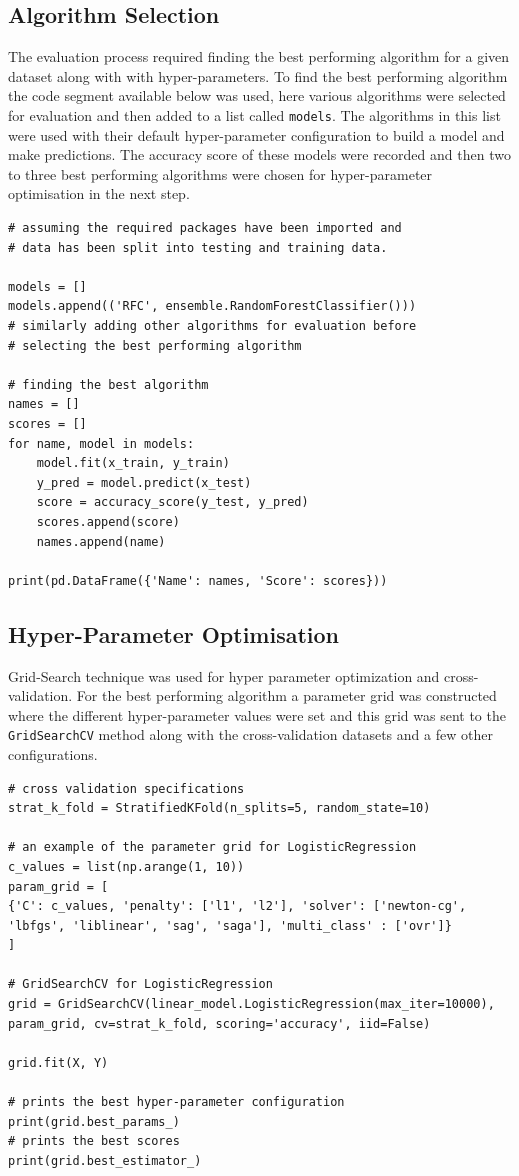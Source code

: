 \subsection*{Algorithm Selection}

The evaluation process required finding the best performing algorithm for a given dataset along with with hyper-parameters. To find the best performing algorithm the code segment available below was used, here various algorithms were selected for evaluation and then added to a list called \texttt{models}. The algorithms in this list were used with their default hyper-parameter configuration to build a model and make predictions. The accuracy score of these models were recorded and then two to three best performing algorithms were chosen for hyper-parameter optimisation in the next step.

\begin{lstlisting}
# assuming the required packages have been imported and 
# data has been split into testing and training data.

models = []
models.append(('RFC', ensemble.RandomForestClassifier()))
# similarly adding other algorithms for evaluation before 
# selecting the best performing algorithm

# finding the best algorithm
names = []
scores = []
for name, model in models:
    model.fit(x_train, y_train)
    y_pred = model.predict(x_test)
    score = accuracy_score(y_test, y_pred)
    scores.append(score)
    names.append(name)

print(pd.DataFrame({'Name': names, 'Score': scores}))
\end{lstlisting}

\subsection*{Hyper-Parameter Optimisation}

Grid-Search technique was used for hyper parameter optimization and cross-validation. For the best performing algorithm a parameter grid was constructed where the different hyper-parameter values were set and this grid was sent to the \texttt{GridSearchCV} method along with the cross-validation datasets and a few other configurations. 

\begin{lstlisting}
# cross validation specifications
strat_k_fold = StratifiedKFold(n_splits=5, random_state=10)

# an example of the parameter grid for LogisticRegression
c_values = list(np.arange(1, 10))
param_grid = [
{'C': c_values, 'penalty': ['l1', 'l2'], 'solver': ['newton-cg', 'lbfgs', 'liblinear', 'sag', 'saga'], 'multi_class' : ['ovr']}
]

# GridSearchCV for LogisticRegression
grid = GridSearchCV(linear_model.LogisticRegression(max_iter=10000), param_grid, cv=strat_k_fold, scoring='accuracy', iid=False)

grid.fit(X, Y)

# prints the best hyper-parameter configuration
print(grid.best_params_)
# prints the best scores
print(grid.best_estimator_)
\end{lstlisting}

